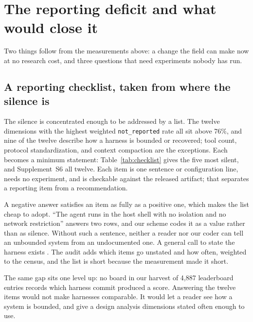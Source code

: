 \section{The reporting deficit and what would close it}
\label{sec:open}

Two things follow from the measurements above: a change the field can make now at no research cost, and
three questions that need experiments nobody has run.

\subsection{A reporting checklist, taken from where the silence is}
\label{subsec:checklist}
\label{subsec:record}

The silence is concentrated enough to be addressed by a list. The twelve dimensions with the highest
weighted \texttt{not\_reported} rate all sit above 76\%, and nine of the twelve describe how a harness is
bounded or recovered; tool count, protocol standardization, and context compaction are the exceptions.
Each becomes a minimum statement: Table~\ref{tab:checklist} gives the five most silent, and
Supplement~S6 all twelve. Each item is
one sentence or configuration line, needs no experiment, and is checkable against the released
artifact; that separates a reporting item from a recommendation.

A negative answer satisfies an item as fully as a positive one, which makes the list cheap to adopt.
``The agent runs in the host shell with no isolation and no network restriction'' answers two rows, and
our scheme codes it as a value rather than as silence. Without such a sentence, neither a reader nor our
coder can tell an unbounded system from an undocumented one. A general call to state the harness exists
\citep{zhang2026harnessreporting}. The audit adds which items go unstated and how often, weighted to the
census, and the list is short because the measurement made it short.

The same gap sits one level up: no board in our harvest of 4,887 leaderboard entries records which
harness commit produced a score. Answering the twelve items would not make harnesses comparable. It
would let a reader see how a system is bounded, and give a design analysis dimensions stated often
enough to use.

